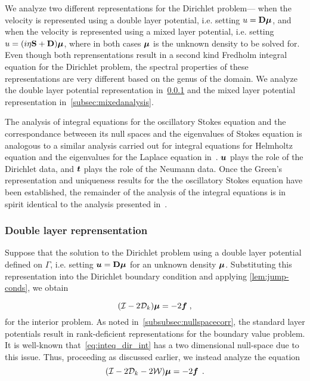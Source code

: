 We analyze two different representations for the Dirichlet problem---
when the velocity is represented using a double layer potential,
i.e. setting $u={\bf D} {\boldsymbol \mu}$, and when the velocity
is represented using a mixed layer potential,
i.e. setting $u=(i\eta {\bf S} + {\bf D}){\boldsymbol \mu}$, where in both cases ${\boldsymbol \mu}$ 
is the unknown density to be solved for. 
Even though both reprensentations result in a second kind
Fredholm integral equation for the Dirichlet problem,
the spectral properties of these representations are very
different based on the genus of the domain.
We analyze the double layer potential representation 
in~\cref{subsec:dlanalysis}
and the mixed layer potential representation in~\cref{subsec:mixedanalysis}.

\begin{remark}
The analysis of integral equations for the oscillatory Stokes
equation and the correspondance betweeen its null spaces and the eigenvalues
of Stokes equation is analogous to a similar analysis carried out
for integral equations for Helmholtz equation and the eigenvalues
for the Laplace equation in~\cite{zhao2015robust}.
${\boldsymbol u}$ plays the role of the Dirichlet data, and ${\boldsymbol t}$ plays the role
of the Neumann data. 
Once the Green's representation and uniqueness results for the 
the oscillatory Stokes equation have been established,
the remainder of the analysis of the integral equations
is in spirit identical to the analysis presented in~\cite{zhao2015robust}.
\end{remark}

\subsubsection{Double layer reprensentation}
\label{subsec:dlanalysis}
Suppose that the solution to the Dirichlet problem using
a double layer potential defined on $\Gamma$, i.e.
setting ${\boldsymbol u} = {\bf D} {\boldsymbol \mu}$ for
an unknown density ${\boldsymbol \mu}$. 
Substituting this representation
into the Dirichlet boundary condition and applying
\cref{lem:jump-conds}, we obtain

\begin{equation}
  (\mathcal I - 2{\mathcal D}_{k}) {\boldsymbol \mu} = -2{\boldsymbol f} \; , \label{eq:inteq_dir_int}
\end{equation}
for the interior problem.
As noted in~\cref{subsubsec:nullspacecorr}, the standard layer potentials
result in rank-deficient representations for the boundary value problem.
It is well-known that~\cref{eq:inteq_dir_int} has a two dimensional
null-space due to this issue. Thus, proceeding as discussed earlier,
we instead analyze the equation
\begin{equation}
(\mathcal I - 2{\mathcal D}_{k}  -2{\mathcal W}) {\boldsymbol \mu} = -2{\boldsymbol f} \; \, . \label{eq:inteq_dir_int_mod}
\end{equation}

